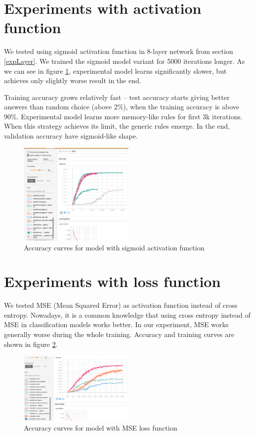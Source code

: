 \documentclass[a4paper]{article}
\begin{document}
\section{Experiments with activation function}

We tested using sigmoid activation function in 8-layer network from section \ref{expLayer}.
We trained the sigmoid model variant for 5000 iterations longer.
As we can see in figure \ref{fig:sigmoid}, experimental model learns significantly slower,
but achieves only slightly worse result in the end.

Training accuracy grows relatively fast -- test accuracy
starts giving better answers than random choice (above 2\%),
when the training accuracy is above 90\%.
Experimental model learns more memory-like rules for first 3k iterations.
When this strategy achieves its limit, the generic rules emerge.
In the end, validation accuracy have sigmoid-like shape.



\begin{figure}[!hbt]
    \centering
    \includegraphics[page=2,width=0.5\textwidth]{sigmoidConv.png}
    \caption[]{Accuracy curves for model with sigmoid activation function
    \label{fig:sigmoid}
    }
\end{figure}


\section{Experiments with loss function}

We tested MSE (Mean Squared Error) as activation function instead of cross entropy.
Nowadays, it is a common knowledge that using cross entropy instead of
MSE in classification models works better.
In our experiment, MSE works generally worse during the whole training.
Accuracy and training curves are shown in figure \ref{fig:mse}.

\begin{figure}[!hbt]
    \centering
    \includegraphics[page=2,width=0.5\textwidth]{sqrLoss.png}
    \caption[]{Accuracy curves for model with MSE loss function
    \label{fig:mse}
    }
\end{figure}
\end{document}
